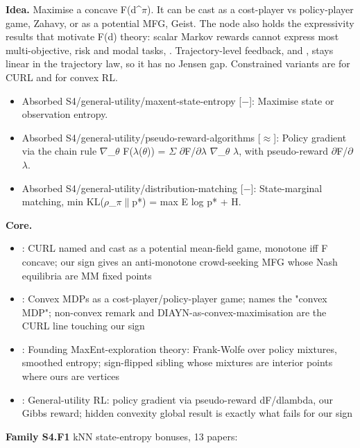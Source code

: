 \documentclass[10pt]{article}
\newcommand{\memb}[1]{\par\smallskip\textbf{#1}\quad}
\begin{document}
\textbf{Idea.} Maximise a concave F(d\^{}\ensuremath{\pi}). It can be cast as a cost-player vs policy-player game, Zahavy, or as a potential MFG, Geist. The node also holds the expressivity results that motivate F(d) theory: scalar Markov rewards cannot express most multi-objective, risk and modal tasks, \citet{Skalse-limitations24}. Trajectory-level feedback, \citet{Chatterji-theory21} and \citet{Efroni-reinforcement20}, stays linear in the trajectory law, so it has no Jensen gap. Constrained variants are \citet{Agarwal-concave21} for CURL and \citet{Li-double24} for convex RL.
\begin{itemize}[nosep,leftmargin=1.2em]
\item Absorbed S4/general-utility/maxent-state-entropy [\ensuremath{-}]: Maximise state or observation entropy.
\item Absorbed S4/general-utility/pseudo-reward-algorithms [\ensuremath{\approx}]: Policy gradient via the chain rule \ensuremath{\nabla}\_\ensuremath{\theta} F(\ensuremath{\lambda}(\ensuremath{\theta})) = \ensuremath{\Sigma} \ensuremath{\partial}F/\ensuremath{\partial}\ensuremath{\lambda} \ensuremath{\nabla}\_\ensuremath{\theta} \ensuremath{\lambda}, with pseudo-reward \ensuremath{\partial}F/\ensuremath{\partial}\ensuremath{\lambda}.
\item Absorbed S4/general-utility/distribution-matching [\ensuremath{-}]: State-marginal matching, min KL(\ensuremath{\rho}\_\ensuremath{\pi}\ensuremath{\|}p*) = max E log p* + H.
\end{itemize}


\memb{Core.}
\begin{itemize}[nosep,leftmargin=1.2em]
\item \citet{Geist-concave22}: CURL named and cast as a potential mean-field game, monotone iff F concave; our sign gives an anti-monotone crowd-seeking MFG whose Nash equilibria are MM fixed points
\item \citet{Zahavy-reward21}: Convex MDPs as a cost-player/policy-player game; names the "convex MDP"; non-convex remark and DIAYN-as-convex-maximisation are the CURL line touching our sign
\item \citet{Hazan-provably19}: Founding MaxEnt-exploration theory: Frank-Wolfe over policy mixtures, smoothed entropy; sign-flipped sibling whose mixtures are interior points where ours are vertices
\item \citet{Zhang-variational20}: General-utility RL: policy gradient via pseudo-reward dF/dlambda, our Gibbs reward; hidden convexity global result is exactly what fails for our sign
\end{itemize}
\memb{Family S4.F1} kNN state-entropy bonuses, 13 papers: {\footnotesize \citetext{\citealp{Mutti-taskagnostic21}; \citealp{Liu-behavior21}; \citealp{Seo-state21}; \citealp{Yang-cem23}; \citealp{Li-element24}; \citealp{Badia-never20}; \citealp{Tao-novelty20}; \citealp{Nedergaard-kmeans22}; \citealp{Rajeswar-mastering23}; \citealp{Yarats-dont22}; \citealp{Yuan-renyi22}; \citealp{Kim-accelerating23}; \citealp{Suttle-behavioral25}}}
\end{document}
